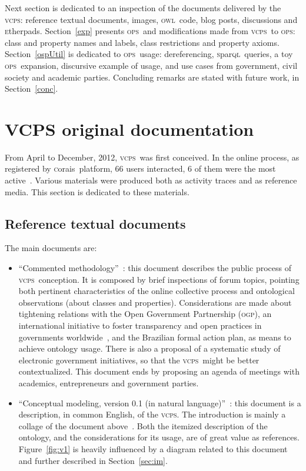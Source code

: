 \documentclass[10pt,letterpaper]{article}
\newcommand{\ops}{\textsc{ops}}
\newcommand{\vcps}{\textsc{vcps}}
\newcommand{\owl}{\textsc{owl}}
\newcommand{\sparql}{\textsc{s}par\textsc{ql}}
\newcommand{\etherpad}{\textsc{e}therpad}
\newcommand{\ogp}{\textsc{ogp}}
\newcommand{\corais}{\textsc{c}orais}
\begin{document}
Next section is dedicated to an inspection of the documents delivered by the \vcps: reference textual documents, images, \owl\ code, blog posts, discussions and \etherpad s. Section~\ref{exp} presents \ops\ and modifications made from \vcps\ to \ops: class and property names and labels, class restrictions and property axioms. Section~\ref{ospUtil} is dedicated to \ops\ usage: dereferencing, \sparql\ queries, a toy \ops\ expansion, discursive example of usage, and use cases from government, civil society and academic parties. Concluding remarks are stated with future work, in Section~\ref{conc}. 


\section{VCPS original documentation}
From April to December, 2012, \vcps\ was first conceived. In the online process, as registered by \corais\ platform, 66 users interacted, 6 of them were the most active~\cite{metodologia}. Various materials were produced both as activity traces and as reference media. This section is dedicated to these materials.

\subsection{Reference textual documents}\label{refDocs}
The main documents are:
\begin{itemize}
    \item ``Commented methodology''~\cite{metodologia}: this document describes the public process of \vcps\ conception. It is composed by brief inspections of forum topics, pointing both pertinent characteristics of the online collective process and ontological observations (about classes and properties). Considerations are made about tightening relations with the Open Government Partnership (\ogp), an international initiative to foster transparency and open practices in governments worldwide~\cite{OGP}, and the Brazilian formal action plan, as means to achieve ontology usage. 
     There is also a proposal of a systematic study of electronic government initiatives, so that the \vcps\ might be better contextualized. This document ends by proposing an agenda of meetings with academics, entrepreneurs and government parties.
 \item ``Conceptual modeling, version 0.1 (in natural language)''~\cite{conceptualMod}: this document is a description, in common English, of the \vcps. The introduction is mainly a collage of the document above~\cite{metodologia}. Both the itemized description of the ontology, and the considerations for its usage, are of great value as references. Figure~\ref{fig:v1} is heavily influenced by a diagram related to this document and further described in Section~\ref{sec:im}.
\end{itemize}
\end{document}
